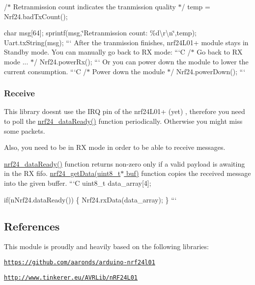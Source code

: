 /$\ast$ Retranmission count indicates the tranmission quality $\ast$/ temp = Nrf24.\+bad\+Tx\+Count();

char msg\mbox{[}64\mbox{]}; sprintf(msg,\char`\"{}\+Retranmission count\+: \%d\textbackslash{}r\textbackslash{}n\char`\"{},temp); Uart.\+tx\+String(msg); ``` After the tranmission finishes, nrf24\+L01+ module stays in Standby mode. You can manually go back to R\+X mode\+: ```\+C /$\ast$ Go back to R\+X mode ... $\ast$/ Nrf24.\+power\+Rx(); ``` Or you can power down the module to lower the current consumption. ```\+C /$\ast$ Power down the module $\ast$/ Nrf24.\+power\+Down(); ``` \subsubsection*{Receive}

This library doesn\textquotesingle{}t use the I\+R\+Q pin of the nrf24\+L01+ (yet) , therefore you need to poll the {\ttfamily \hyperlink{nrf24_8c_a712c0b5e8c339da2e8f36cfbba8892ac}{nrf24\+\_\+data\+Ready()}} function periodically. Otherwise you might miss some packets.

Also, you need to be in R\+X mode in order to be able to receive messages.

{\ttfamily \hyperlink{nrf24_8c_a712c0b5e8c339da2e8f36cfbba8892ac}{nrf24\+\_\+data\+Ready()}} function returns non-\/zero only if a valid payload is awaiting in the R\+X fifo. {\ttfamily \hyperlink{nrf24_8h_a195d164f0c500d345d23ca1dfa3fa0d1}{nrf24\+\_\+get\+Data(uint8\+\_\+t$\ast$ buf)}} function copies the received message into the given buffer. ```\+C uint8\+\_\+t data\+\_\+array\mbox{[}4\mbox{]};

if(n\+Nrf24.\+data\+Ready()) \{ Nrf24.\+rx\+Data(data\+\_\+array); \} ``` \subsection*{References}

This module is proudly and heavily based on the following libraries\+:


\begin{DoxyItemize}
\item \href{https://github.com/aaronds/arduino-nrf24l01}{\tt https\+://github.\+com/aaronds/arduino-\/nrf24l01}
\item \href{http://www.tinkerer.eu/AVRLib/nRF24L01}{\tt http\+://www.\+tinkerer.\+eu/\+A\+V\+R\+Lib/n\+R\+F24\+L01} 
\end{DoxyItemize}